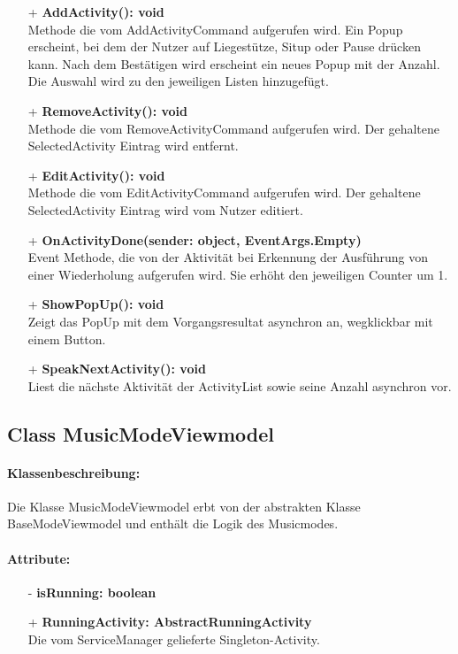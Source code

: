 \documentclass[a4paper,12pt]{article}
\begin{document}
\begin{itemize}
	\item[+] \textbf{ AddActivity(): void} \\  Methode die vom AddActivityCommand aufgerufen wird. Ein Popup erscheint, bei dem der Nutzer auf Liegestütze, Situp oder Pause drücken kann. Nach dem Bestätigen wird erscheint ein neues Popup mit der Anzahl. Die Auswahl wird zu den jeweiligen Listen hinzugefügt. 
	\item[+] \textbf{RemoveActivity(): void} \\  Methode die vom RemoveActivityCommand aufgerufen wird. Der gehaltene SelectedActivity Eintrag wird entfernt. 
	\item[+] \textbf{EditActivity(): void} \\ Methode die vom EditActivityCommand aufgerufen wird. Der gehaltene SelectedActivity Eintrag wird vom Nutzer editiert.
	\item[+] \textbf{ OnActivityDone(sender: object, EventArgs.Empty)} \\ Event Methode, die von der Aktivität bei Erkennung der Ausführung von einer Wiederholung aufgerufen wird. Sie erhöht den jeweiligen Counter um 1.  
	\item[+] \textbf{ShowPopUp(): void} \\ Zeigt das PopUp mit dem Vorgangsresultat asynchron an, wegklickbar mit einem Button. 
	\item[+] \textbf{SpeakNextActivity(): void} \\ Liest die nächste Aktivität der ActivityList sowie seine Anzahl asynchron vor. 
\end{itemize}

\subsection{Class MusicModeViewmodel}
\paragraph{Klassenbeschreibung:}
Die Klasse MusicModeViewmodel erbt von der abstrakten Klasse BaseModeViewmodel und enthält die Logik des Musicmodes.
\paragraph{Attribute:}
\begin{itemize}
	\item[-] \textbf{isRunning: boolean}
	\item[+] \textbf{RunningActivity: AbstractRunningActivity} \\ Die vom ServiceManager gelieferte Singleton-Activity.
\end{itemize}
\end{document}
